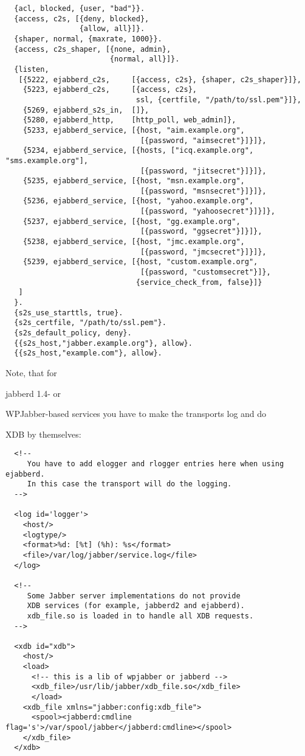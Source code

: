 \documentclass[a4paper,10pt]{book}
\newcommand{\ind}[1]{\begin{latexonly}\index{#1}\end{latexonly}}
\begin{document}
\begin{verbatim}
  {acl, blocked, {user, "bad"}}.
  {access, c2s, [{deny, blocked},
                 {allow, all}]}.
  {shaper, normal, {maxrate, 1000}}.
  {access, c2s_shaper, [{none, admin},
                        {normal, all}]}.
  {listen,
   [{5222, ejabberd_c2s,     [{access, c2s}, {shaper, c2s_shaper}]},
    {5223, ejabberd_c2s,     [{access, c2s},
                              ssl, {certfile, "/path/to/ssl.pem"}]},
    {5269, ejabberd_s2s_in,  []},
    {5280, ejabberd_http,    [http_poll, web_admin]},
    {5233, ejabberd_service, [{host, "aim.example.org",
                               [{password, "aimsecret"}]}]},
    {5234, ejabberd_service, [{hosts, ["icq.example.org", "sms.example.org"],
                               [{password, "jitsecret"}]}]},
    {5235, ejabberd_service, [{host, "msn.example.org",
                               [{password, "msnsecret"}]}]},
    {5236, ejabberd_service, [{host, "yahoo.example.org",
                               [{password, "yahoosecret"}]}]},
    {5237, ejabberd_service, [{host, "gg.example.org",
                               [{password, "ggsecret"}]}]},
    {5238, ejabberd_service, [{host, "jmc.example.org",
                               [{password, "jmcsecret"}]}]},
    {5239, ejabberd_service, [{host, "custom.example.org",
                               [{password, "customsecret"}]},
                              {service_check_from, false}]}
   ]
  }.
  {s2s_use_starttls, true}.
  {s2s_certfile, "/path/to/ssl.pem"}.
  {s2s_default_policy, deny}.
  {{s2s_host,"jabber.example.org"}, allow}.
  {{s2s_host,"example.com"}, allow}.
\end{verbatim}
Note, that for \ind{jabberd 1.4}jabberd 1.4- or \ind{WPJabber}WPJabber-based
services you have to make the transports log and do \ind{XDB}XDB by themselves:
\begin{verbatim}
  <!--
     You have to add elogger and rlogger entries here when using ejabberd.
     In this case the transport will do the logging.
  -->

  <log id='logger'>
    <host/>
    <logtype/>
    <format>%d: [%t] (%h): %s</format>
    <file>/var/log/jabber/service.log</file>
  </log>

  <!--
     Some Jabber server implementations do not provide
     XDB services (for example, jabberd2 and ejabberd).
     xdb_file.so is loaded in to handle all XDB requests.
  -->

  <xdb id="xdb">
    <host/>
    <load>
      <!-- this is a lib of wpjabber or jabberd -->
      <xdb_file>/usr/lib/jabber/xdb_file.so</xdb_file>
      </load>
    <xdb_file xmlns="jabber:config:xdb_file">
      <spool><jabberd:cmdline flag='s'>/var/spool/jabber</jabberd:cmdline></spool>
    </xdb_file>
  </xdb>
\end{verbatim}
\end{document}
